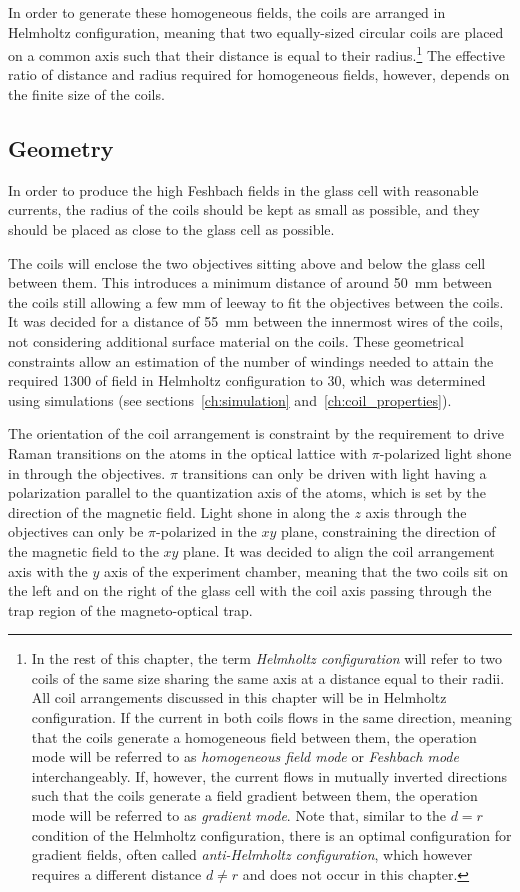In order to generate these homogeneous fields, the coils are arranged in Helmholtz configuration, meaning that two equally-sized circular coils are placed on a common axis such that their distance is equal to their radius.\footnote{In the rest of this chapter, the term \textit{Helmholtz configuration} will refer to two coils of the same size sharing the same axis at a distance equal to their radii. All coil arrangements discussed in this chapter will be in Helmholtz configuration. If the current in both coils flows in the same direction, meaning that the coils generate a homogeneous field between them, the operation mode will be referred to as \textit{homogeneous field mode} or \textit{Feshbach mode} interchangeably. If, however, the current flows in mutually inverted directions such that the coils generate a field gradient between them, the operation mode will be referred to as \textit{gradient mode}. Note that, similar to the $d = r$ condition of the Helmholtz configuration, there is an optimal configuration for gradient fields, often called \textit{anti-Helmholtz configuration}, which however requires a different distance $d \neq r$ and does not occur in this chapter.} The effective ratio of distance and radius required for homogeneous fields, however, depends on the finite size of the coils.

\subsection*{Geometry}
In order to produce the high Feshbach fields in the glass cell with reasonable currents, the radius of the coils should be kept as small as possible, and they should be placed as close to the glass cell as possible.

The coils will enclose the two objectives sitting above and below the glass cell between them. This introduces a minimum distance of around \SI{50}{\milli\meter} between the coils still allowing a few \si[]{\milli\meter} of leeway to fit the objectives between the coils. It was decided for a distance of \SI{55}{\milli\meter} between the innermost wires of the coils, not considering additional surface material on the coils. These geometrical constraints allow an estimation of the number of windings needed to attain the required \SI{1300}{\gauss} of field in Helmholtz configuration to 30, which was determined using simulations (see sections~\ref{ch:simulation} and~\ref{ch:coil_properties}).

The orientation of the coil arrangement is constraint by the requirement to drive Raman transitions on the atoms in the optical lattice with $\pi$-polarized light shone in through the objectives. $\pi$ transitions can only be driven with light having a polarization parallel to the quantization axis of the atoms, which is set by the direction of the magnetic field. Light shone in along the $z$ axis through the objectives can only be $\pi$-polarized in the $xy$ plane, constraining the direction of the magnetic field to the $xy$ plane. It was decided to align the coil arrangement axis with the $y$ axis of the experiment chamber, meaning that the two coils sit on the left and on the right of the glass cell with the coil axis passing through the trap region of the magneto-optical trap.

